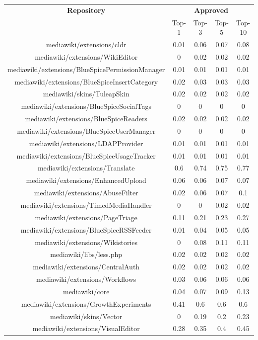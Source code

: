 \begin{center}
\begin{tabular}{@{}c c c c c@{}} 
 \hline
    \textbf{Repository} &
    \multicolumn{4}{c}{\textbf{Approved}} \\
      & {Top-1} & {Top-3} & {Top-5} & {Top-10} \\
      \hline
mediawiki/extensions/cldr & 0.01 & 0.06 & 0.07 & 0.08 \\
mediawiki/extensions/WikiEditor & 0 & 0.02 & 0.02 & 0.02 \\
mediawiki/extensions/BlueSpicePermissionManager & 0.01 & 0.01 & 0.01 & 0.01 \\
mediawiki/extensions/BlueSpiceInsertCategory & 0.02 & 0.03 & 0.03 & 0.03 \\
mediawiki/skins/TuleapSkin & 0.02 & 0.02 & 0.02 & 0.02 \\
mediawiki/extensions/BlueSpiceSocialTags & 0 & 0 & 0 & 0 \\
mediawiki/extensions/BlueSpiceReaders & 0.02 & 0.02 & 0.02 & 0.02 \\
mediawiki/extensions/BlueSpiceUserManager & 0 & 0 & 0 & 0 \\
mediawiki/extensions/LDAPProvider & 0.01 & 0.01 & 0.01 & 0.01 \\
mediawiki/extensions/BlueSpiceUsageTracker & 0.01 & 0.01 & 0.01 & 0.01 \\
mediawiki/extensions/Translate & 0.6 & 0.74 & 0.75 & 0.77 \\
mediawiki/extensions/EnhancedUpload & 0.06 & 0.06 & 0.07 & 0.07 \\
mediawiki/extensions/AbuseFilter & 0.02 & 0.06 & 0.07 & 0.1 \\
mediawiki/extensions/TimedMediaHandler & 0 & 0 & 0.02 & 0.02 \\
mediawiki/extensions/PageTriage & 0.11 & 0.21 & 0.23 & 0.27 \\
mediawiki/extensions/BlueSpiceRSSFeeder & 0.01 & 0.04 & 0.05 & 0.05 \\
mediawiki/extensions/Wikistories & 0 & 0.08 & 0.11 & 0.11 \\
mediawiki/libs/less.php & 0.02 & 0.02 & 0.02 & 0.02 \\
mediawiki/extensions/CentralAuth & 0.02 & 0.02 & 0.02 & 0.02 \\
mediawiki/extensions/Workflows & 0.03 & 0.06 & 0.06 & 0.06 \\
mediawiki/core & 0.04 & 0.07 & 0.09 & 0.13 \\
mediawiki/extensions/GrowthExperiments & 0.41 & 0.6 & 0.6 & 0.6 \\
mediawiki/skins/Vector & 0 & 0.19 & 0.2 & 0.23 \\
mediawiki/extensions/VisualEditor & 0.28 & 0.35 & 0.4 & 0.45 \\
\hline
\end{tabular}
\end{center}

